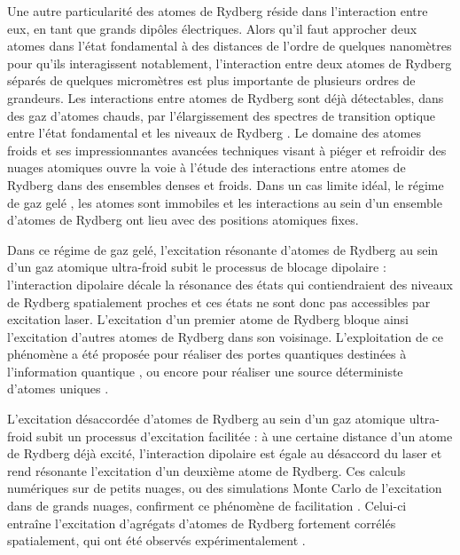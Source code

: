 Une autre particularité des atomes de Rydberg réside dans l'interaction entre eux, en tant que grands dipôles électriques.
Alors qu'il faut approcher deux atomes dans l'état fondamental à des distances de l'ordre de quelques nanomètres pour qu'ils interagissent notablement, l'interaction entre deux atomes de Rydberg séparés de quelques micromètres est plus importante de plusieurs ordres de grandeurs.
Les interactions entre atomes de Rydberg sont déjà détectables, dans des gaz d'atomes chauds, par l'élargissement des spectres de transition optique entre l'état fondamental et les niveaux de Rydberg \cite{ENS_DENSEGAS,ENS_LASERSPEC5SP}.
Le domaine des atomes froids et ses impressionnantes avancées techniques visant à piéger et refroidir des nuages atomiques \cite{Pritchard1983,Dalibard1983,Dalibard1984,Chu1986,CCT1990} ouvre la voie à l'étude des interactions entre atomes de Rydberg dans des ensembles denses et froids.
Dans un cas limite idéal, le régime de \og gaz gelé \fg{} \cite{Gallagher1998,Pillet1998}, les atomes sont immobiles et les interactions au sein d'un ensemble d'atomes de Rydberg ont lieu avec des positions atomiques fixes.


Dans ce régime de gaz gelé, l'excitation résonante d'atomes de Rydberg au sein d'un gaz atomique ultra-froid subit le processus de \og blocage dipolaire \fg{} \cite{Lukin2001} :
l'interaction dipolaire décale la résonance des états qui contiendraient des niveaux de Rydberg spatialement proches et ces états ne sont donc pas accessibles par excitation laser.
L'excitation d'un premier atome de Rydberg bloque ainsi l'excitation d'autres atomes de Rydberg dans son voisinage.
L'exploitation de ce phénomène a été proposée pour réaliser des portes quantiques destinées à l'information quantique \cite{Lukin2001,Lukin2000b,Saffman2010}, ou encore pour réaliser une source déterministe d'atomes uniques \cite{Saffman2002}.

L'excitation désaccordée d'atomes de Rydberg au sein d'un gaz atomique ultra-froid subit un processus d'\og excitation facilitée \fg{} :
à une certaine distance d'un atome de Rydberg déjà excité, l'interaction dipolaire est égale au désaccord du laser et rend résonante l'excitation d'un deuxième atome de Rydberg.
Ces calculs numériques sur de petits nuages, ou des simulations Monte Carlo de l'excitation dans de grands nuages, confirment ce phénomène de facilitation \cite{Robicheaux2005,Rost2007a,Evers2013,Cote2010}.
Celui-ci entraîne l'excitation d'agrégats d'atomes de Rydberg fortement corrélés spatialement, qui ont été observés expérimentalement \cite{Weidemueller2013,Pillet2012}.

